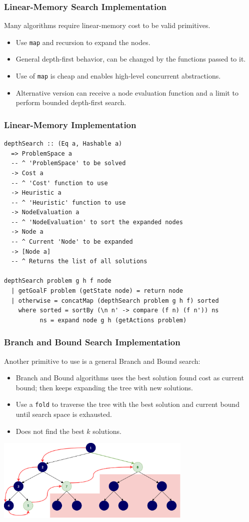 \documentclass{beamer}
\begin{document}
\begin{frame}
  \frametitle{Linear-Memory Search Implementation}
  Many algorithms require linear-memory cost to be valid primitives.
  \begin{itemize}
  \item Use \texttt{map} and recursion to expand the nodes.
  \item General depth-first behavior, can be changed by the functions passed to
    it.
  \item Use of \texttt{map} is cheap and enables high-level concurrent
    abstractions.
  \item Alternative version can receive a node evaluation function and a limit
    to perform bounded depth-first search.
  \end{itemize}
\end{frame}

\begin{frame}[fragile]
  \frametitle{Linear-Memory Implementation}
\begin{lstlisting}[style=haskell]
depthSearch :: (Eq a, Hashable a)
  => ProblemSpace a
  -- ^ 'ProblemSpace' to be solved
  -> Cost a
  -- ^ 'Cost' function to use
  -> Heuristic a
  -- ^ 'Heuristic' function to use
  -> NodeEvaluation a
  -- ^ 'NodeEvaluation' to sort the expanded nodes
  -> Node a
  -- ^ Current 'Node' to be expanded
  -> [Node a]
  -- ^ Returns the list of all solutions

depthSearch problem g h f node
  | getGoalF problem (getState node) = return node
  | otherwise = concatMap (depthSearch problem g h f) sorted
    where sorted = sortBy (\n n' -> compare (f n) (f n')) ns
          ns = expand node g h (getActions problem)
\end{lstlisting}
\end{frame}

\begin{frame}
  \frametitle{Branch and Bound Search Implementation}
  Another primitive to use is a general Branch and Bound search:
  \begin{itemize}
  \item Branch and Bound algorithms uses the best solution found cost as
    current bound; then keeps expanding the tree with new solutions.
  \item Use a \texttt{fold} to traverse the tree with the best solution and
    current bound until search space is exhausted.
  \item Does not find the best $k$ solutions.
  \end{itemize}
  \centering
  \includegraphics[width=0.7\textwidth]{dfbnb.png}
\end{frame}
\end{document}
